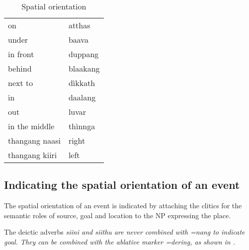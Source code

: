 \begin{table}
	\centering
		\begin{tabular}{ll}
			on & atthas\\
			under & baava\\
			in front & duppang\\
			behind &blaakang\\
			next to & dìkkath\\
			in & daalang\\
  			out & luvar\\
			in the middle& thìnnga\\
			thangang naasi & right\\
 			thangang kiiri & left\\
		\end{tabular}
	\caption[Spatial orientation]{Spatial orientation}
	\label{tab:SpatialOrientation}
\end{table}




\subsection{Indicating the spatial orientation of an event}\label{sec:func:Indicatingthespatialorientationofanevent}
The spatial orientation of an event is indicated by attaching the clitics for the semantic roles of source, goal and location   to the  NP expressing the place.



The deictic adverbs \em siini \em and \em siithu \em  are never combined with \em =nang \em to indicate  goal.
They can be combined with the ablative marker \em =dering\em, as shown in .



